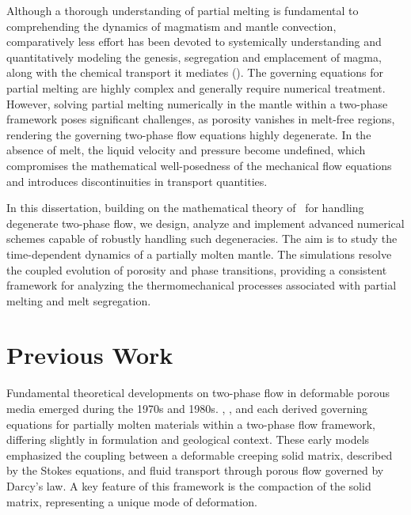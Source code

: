 Although a thorough understanding of partial melting is fundamental to comprehending the 
dynamics of magmatism and mantle convection, comparatively less effort has been devoted to 
systemically understanding and quantitatively modeling the genesis, segregation and emplacement
of magma, along with the chemical transport it mediates (\cite{DynamicsPartiallyMoltenRock}).
The governing equations for partial 
melting are highly complex and generally require numerical treatment. 
However, solving partial melting numerically in the mantle within a two-phase 
framework 
poses significant challenges, as 
porosity vanishes in melt-free regions, rendering the governing two-phase flow 
equations highly degenerate. 
In the absence of melt, the liquid velocity and pressure become undefined, 
which compromises the mathematical well-posedness of the mechanical flow equations and 
introduces discontinuities in transport quantities.

In this dissertation, building on the mathematical theory of~\cite{DegenerateDarcy} 
for handling degenerate two-phase flow, we design, analyze and implement 
advanced numerical schemes capable of robustly handling such degeneracies. 
The aim is to study the time-dependent dynamics 
of a partially molten mantle. The simulations resolve the coupled evolution of 
porosity and phase transitions, providing a consistent framework for analyzing 
the thermomechanical processes associated with partial melting and melt segregation.

\section{Previous Work}
Fundamental theoretical developments on two-phase flow in deformable porous media emerged during the 1970s and 1980s.
\cite{MUSH}, \cite{ctx23979187210006011}, \cite{Fowler01031984} and 
\cite{MagmaPhysics} each derived governing equations for partially molten materials within a two-phase flow framework, 
differing slightly in formulation and geological context. 
These early models emphasized the coupling between a deformable creeping solid matrix, described by the Stokes equations, 
and fluid transport through porous flow governed by Darcy’s law. A key feature of this framework is the compaction of the solid 
matrix, representing a unique mode of deformation.

